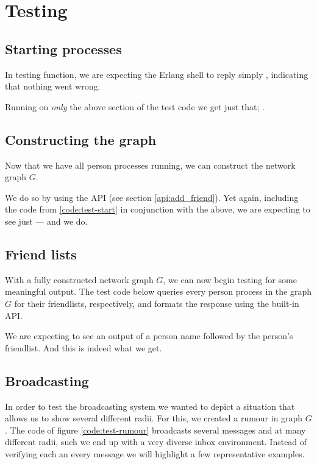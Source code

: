 \section{Testing}

\subsection{Starting processes}
In testing  function, we are expecting the Erlang shell to reply
simply , indicating that nothing went wrong.


Running  on {\it only} the above
section of the test code we get just that; .

\subsection{Constructing the graph}
Now that we have all person processes running, we can construct the network
graph $G$.


We do so by using the  API (see section
\ref{api:add_friend}). Yet again, including the code from
\ref{code:test-start} in conjunction with the above, we are expecting to see
just  --- and we do.

\subsection{Friend lists}
With a fully constructed network graph $G$, we can now begin testing for some
meaningful output. The test code below queries every person process in the
graph $G$ for their friendlists, respectively, and formats the response using
the built-in  API.


We are expecting to see an output of a person name followed by the person's
friendlist. And this is indeed what we get.

\subsection{Broadcasting}
In order to test the broadcasting system we wanted to depict a situation that
allows us to show several different radii. For this, we created a rumour in
graph $G$. The code of figure \ref{code:test-rumour} broadcasts several
messages and at many different radii, such we end up with a very diverse
inbox environment. Instead of verifying each an every message we will
highlight a few representative examples.

